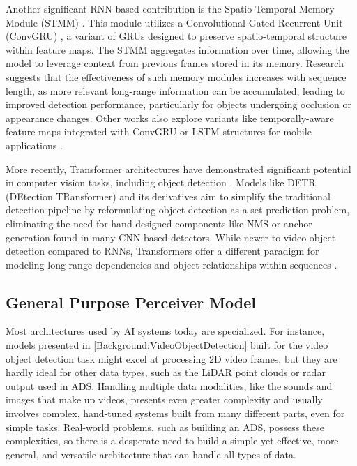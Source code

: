 Another significant RNN-based contribution is the Spatio-Temporal Memory Module (STMM) \cite{xiaoVideoObjectDetection2018}. This module utilizes a Convolutional Gated Recurrent Unit (ConvGRU) \cite{ballasDelvingDeeperConvolutional2016}, a variant of GRUs designed to preserve spatio-temporal structure within feature maps. The STMM aggregates information over time, allowing the model to leverage context from previous frames stored in its memory. Research suggests that the effectiveness of such memory modules increases with sequence length, as more relevant long-range information can be accumulated, leading to improved detection performance, particularly for objects undergoing occlusion or appearance changes. Other works also explore variants like temporally-aware feature maps integrated with ConvGRU or LSTM structures for mobile applications \cite{}.

More recently, Transformer architectures \cite{vaswaniAttentionAllYou2017} have demonstrated significant potential in computer vision tasks, including object detection \cite{carionEndToEndObjectDetection2020, zhuDeformableDETRDeformable2021}. Models like DETR (DEtection TRansformer) \cite{carionEndToEndObjectDetection2020, zhuDeformableDETRDeformable2021} and its derivatives aim to simplify the traditional detection pipeline by reformulating object detection as a set prediction problem, eliminating the need for hand-designed components like NMS or anchor generation found in many CNN-based detectors. While newer to video object detection compared to RNNs, Transformers offer a different paradigm for modeling long-range dependencies and object relationships within sequences \cite{wangEndtoEndVideoObject2021, shvetsTrackingObjectsAs2021}.

\subsection{General Purpose Perceiver Model} \label{Background:Perceiver}

Most architectures used by AI systems today are specialized. For instance, models presented in \ref{Background:VideoObjectDetection} built for the video object detection task might excel at processing 2D video frames, but they are hardly ideal for other data types, such as the LiDAR point clouds or radar output used in ADS. Handling multiple data modalities, like the sounds and images that make up videos, presents even greater complexity and usually involves complex, hand-tuned systems built from many different parts, even for simple tasks. Real-world problems, such as building an ADS, possess these complexities, so there is a desperate need to build a simple yet effective, more general, and versatile architecture that can handle all types of data.

